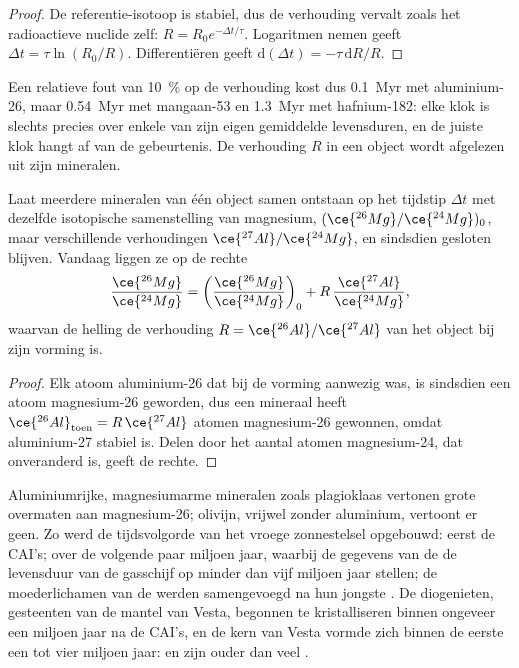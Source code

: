 \begin{proof}
De referentie-isotoop is stabiel, dus de verhouding vervalt zoals het radioactieve
nuclide zelf: $R = R_0 e^{-\Delta t/\tau}$. Logaritmen nemen geeft
$\Delta t = \tau\ln(R_0/R)$. Differentiëren geeft $\mathrm d(\Delta t) =
-\tau\,\mathrm dR/R$.
\end{proof}

Een relatieve fout van \qty{10}{\percent} op de verhouding kost dus
\qty{0.1}{Myr} met aluminium-26, maar \qty{0.54}{Myr} met mangaan-53 en
\qty{1.3}{Myr} met hafnium-182: elke klok is slechts precies over enkele van zijn
eigen gemiddelde levensduren, en de juiste klok hangt af van de gebeurtenis. De verhouding $R$ in een
object wordt afgelezen uit zijn mineralen.

\begin{proposition}
\label{prop:b2:planet-formation-meteorites:al-mg}
Laat meerdere mineralen van één object samen ontstaan op het tijdstip $\Delta t$ met
dezelfde isotopische samenstelling van magnesium, $(\ce{^{26}Mg}/\ce{^{24}Mg})_0$, maar
verschillende verhoudingen $\ce{^{27}Al}/\ce{^{24}Mg}$, en sindsdien gesloten blijven. Vandaag
liggen ze op de rechte
\[
  \frac{\ce{^{26}Mg}}{\ce{^{24}Mg}}
  = \left(\frac{\ce{^{26}Mg}}{\ce{^{24}Mg}}\right)_0
  + R\,\frac{\ce{^{27}Al}}{\ce{^{24}Mg}},
\]
waarvan de helling de verhouding $R = \ce{^{26}Al}/\ce{^{27}Al}$ van het object bij zijn
vorming is.
\end{proposition}

\begin{proof}
Elk atoom aluminium-26 dat bij de vorming aanwezig was, is sindsdien een
atoom magnesium-26 geworden, dus een mineraal heeft
$\ce{^{26}Al}_{\text{toen}} = R\,\ce{^{27}Al}$ atomen magnesium-26 gewonnen, omdat aluminium-27
stabiel is. Delen door het aantal atomen magnesium-24, dat onveranderd is,
geeft de rechte.
\end{proof}

Aluminiumrijke, magnesiumarme mineralen zoals plagioklaas vertonen grote overmaten
aan magnesium-26; olivijn, vrijwel zonder aluminium, vertoont er geen. Zo werd de
tijdsvolgorde van het vroege zonnestelsel opgebouwd: eerst de CAI's;  over
de volgende paar miljoen jaar, waarbij de gegevens van de  de
levensduur van de gasschijf op minder dan vijf miljoen jaar stellen; de moederlichamen van
de  werden samengevoegd na hun jongste . De diogenieten,
gesteenten van de mantel van Vesta, begonnen te kristalliseren binnen ongeveer een miljoen jaar na
de CAI's, en de kern van Vesta vormde zich binnen de eerste een tot
vier miljoen jaar:  en  zijn ouder dan veel
.

